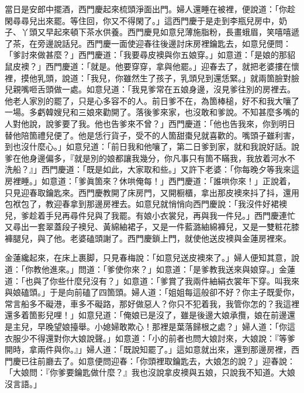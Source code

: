 當日是安郎中擺酒，西門慶起來梳頭淨面出門。婦人還睡在被裡，便說道：「你趁閑尋尋兒出來罷。等住回，你又不得閑了。」{}這西門慶于是走到李瓶兒房中，奶子、丫頭又早起來頓下茶水供養。西門慶見如意兒薄施脂粉，長畫蛾眉，笑嘻嘻遞了茶，在旁邊說話兒。西門慶一面使迎春往後邊討床房裡鑰匙去，如意兒便問：「爹討來做甚麼？」西門慶道：「我要尋皮襖與你五娘穿。」如意道：「是娘的那貂鼠皮襖？」西門慶道：「就是。他要穿穿，拿與他罷。」迎春去了，就把老婆摟在懷裡，摸他乳頭，說道：「我兒，你雖然生了孩子，乳頭兒到還恁緊。」就兩箇臉對臉兒親嘴咂舌頭做一處。如意兒道：「我見爹常在五娘身邊，沒見爹往別的房裡去。{}他老人家別的罷了，只是心多容不的人。前日爹不在，為箇棒槌，好不和我大嚷了一場。多虧韓嫂兒和三娘來勸開了。落後爹來家，也沒敢和爹說。不知甚麼多嘴的人對他說，說爹要了我。他也告爹來不曾？」西門慶道：「他也告我來，你到明日替他陪箇禮兒便了。他是恁行貨子，受不的人箇甜棗兒就喜歡的。{}嘴頭子雖利害，到也沒什麼心。」如意兒道：「前日我和他嚷了，第二日爹到家，就和我說好話。說爹在他身邊偏多，『就是別的娘都讓我幾分，你凡事只有箇不瞞我，我放着河水不洗船？』」西門慶道：「既是如此，大家取和些。」{}又許下老婆：「你每晚夕等我來這房裡睡。」如意道：「爹眞箇來？休哄俺每！」西門慶道：「誰哄你來！」正說着，只見迎春取鑰匙來。西門慶教開了床房門，又開橱櫃，拿出那皮襖來抖了抖，還用包袱包了，教迎春拿到那邊房裡去。如意兒就悄悄向西門慶說：{}「我沒件好裙襖兒，爹趁着手兒再尋件兒與了我罷。有娘小衣裳兒，再與我一件兒。」西門慶連忙又尋出一套翠蓋段子襖兒、黃綿紬裙子，又是一件藍潞紬綿褲兒，又是一雙粧花膝褲腿兒，與了他。老婆磕頭謝了。西門慶鎖上門，就使他送皮襖與金蓮房裡來。

金蓮纔起來，在床上裹脚，只見春梅說：「如意兒送皮襖來了。」婦人便知其意，說道：「你教他進來。」問道：「爹使你來？」如意道：「是爹教我送來與娘穿。」金蓮道：「也與了你些什麼兒沒有？」{}如意道：「爹賞了我兩件紬絹衣裳年下穿。叫我來與娘磕頭。」于是向前磕了四箇頭。{}婦人道：「姐姐每這般卻不好？你主子既愛你，常言船多不礙港，車多不礙路，那好做惡人？你只不犯着我，我管你怎的？我這裡還多着箇影兒哩！」如意兒道：「俺娘已是沒了，雖是後邊大娘承攬，娘在前邊還是主兒，早晚望娘擡舉。小媳婦敢欺心！那裡是葉落歸根之處？」婦人道：「你這衣服少不得還對你大娘說聲。」如意道：「小的前者也問大娘討來，大娘說：『等爹開時，拿兩件與你。』」婦人道：「既說知罷了。」這如意就出來，還到那邊房裡，西門慶已往前廳去了。如意便問迎春：「你頭裡取鑰匙去，大娘怎的說？」迎春說：「大娘問：『你爹要鑰匙做什麼？』我也沒說拿皮襖與五娘，只說我不知道。大娘沒言語。」{}

